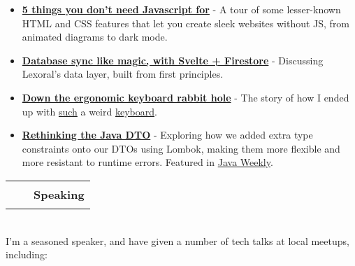 \documentclass[hidelinks, 12pt, a4paper]{article}
\begin{document}
	\begin{itemize}
		\item \begin{small}\href{https://lexoral.com/blog/you-dont-need-js/}{\textbf{5 things you don't need Javascript for}} - A tour of some lesser-known HTML and CSS features that let you create sleek websites without JS, from animated diagrams to dark mode.\end{small}
		
		\item \begin{small}\href{https://lexoral.com/blog/svelte-firestore-binding/}{\textbf{Database sync like magic, with Svelte + Firestore}} - Discussing Lexoral's data layer, built from first principles.\end{small}
		
		\item \begin{small}\href{https://blog.scottlogic.com/2020/10/09/ergo-rabbit-hole.html}{\textbf{Down the ergonomic keyboard rabbit hole}} - The story of how I ended up with \href{https://blog.scottlogic.com/swaterman/assets/ergo-rabbit-hole/layer0.png}{such} a weird \href{https://ergodox-ez.com/}{keyboard}.\end{small}
		
		\item \begin{small}\href{https://blog.scottlogic.com/2020/01/03/rethinking-the-java-dto.html}{\textbf{Rethinking the Java DTO}} - Exploring how we added extra type constraints onto our DTOs using Lombok, making them more flexible and more resistant to runtime errors. Featured in \href{https://www.baeldung.com/java-weekly-315}{Java Weekly}.\end{small}
	\end{itemize}
	
	\begin{tabularx}{\textwidth}{@{}Xrr@{}}&
		\rule{50pt}{1pt}&
		\textbf{Speaking}
	\end{tabularx}\\

	I'm a seasoned speaker, and have given a number of tech talks at local meetups, including:
	
\end{document}
